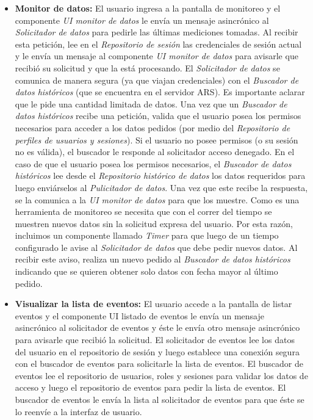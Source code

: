 \begin{itemize}
    \item \textbf{Monitor de datos:} El usuario ingresa a la pantalla de monitoreo y el componente \textit{UI monitor de datos} le envía un mensaje asincrónico al \textit{Solicitador de datos} para pedirle las últimas mediciones tomadas. Al recibir esta petición, lee en el \textit{Repositorio de sesión} las credenciales de sesión actual y le envía un mensaje al componente \textit{UI monitor de datos} para avisarle que recibió su solicitud y que la está procesando. El \textit{Solicitador de datos} se comunica de manera segura (ya que viajan credenciales) con el \textit{Buscador de datos históricos} (que se encuentra en el servidor ARS). Es importante aclarar que le pide una cantidad limitada de datos. Una vez que un \textit{Buscador de datos históricos} recibe una petición, valida que el usuario posea los permisos necesarios para acceder a los datos pedidos (por medio del \textit{Repositorio de perfiles de usuarios y sesiones}). Si el usuario no posee permisos (o su sesión no es válida), el buscador le responde al solicitador acceso denegado. En el caso de que el usuario posea los permisos necesarios, el \textit{Buscador de datos históricos} lee desde el \textit{Repositorio histórico de datos} los datos requeridos para luego enviárselos al \textit{Pulicitador de datos}. Una vez que este recibe la respuesta, se la comunica a la \textit{UI monitor de datos} para que los muestre. Como es una herramienta de monitoreo se necesita que con el correr del tiempo se muestren nuevos datos sin la solicitud expresa del usuario. Por esta razón, incluimos un componente llamado \textit{Timer} para que luego de un tiempo configurado le avise al \textit{Solicitador de datos} que debe pedir nuevos datos. Al recibir este aviso, realiza un nuevo pedido al \textit{Buscador de datos históricos} indicando que se quieren obtener solo datos con fecha mayor al último pedido.
    \item \textbf{Visualizar la lista de eventos:} El usuario accede a la pantalla de listar eventos y el componente UI listado de eventos le envía un mensaje asincrónico al solicitador de eventos y éste le envía otro mensaje asincrónico para avisarle que recibió la solicitud. El solicitador de eventos lee los datos del usuario en el repositorio de sesión y luego establece una conexión segura con el buscador de eventos para solicitarle la lista de eventos. El buscador de eventos lee el repositorio de usuarios, roles y sesiones para validar los datos de acceso y luego el repositorio de eventos para pedir la lista de eventos. El buscador de eventos le envía la lista al solicitador de eventos para que éste se lo reenvíe a la interfaz de usuario. \\

\end{itemize}
